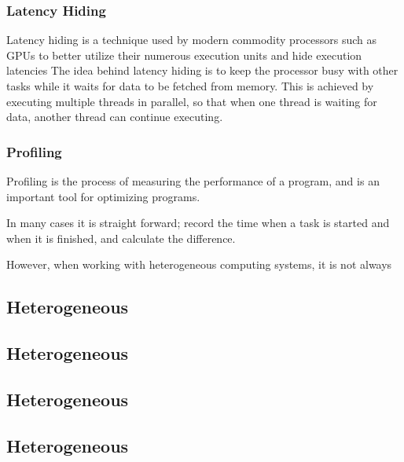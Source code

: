 \subsubsection{Latency Hiding}
Latency hiding is a technique used by modern commodity processors such as GPUs to better utilize their numerous execution units and hide execution latencies \cite[35]{Volkov:EECS-2016-143}
The idea behind latency hiding is to keep the processor busy with other tasks while it waits for data to be fetched from memory.
This is achieved by executing multiple threads in parallel, so that when one thread is waiting for data, another thread can continue executing.


\subsubsection{Profiling}
Profiling is the process of measuring the performance of a program, and is an important tool for optimizing programs.

In many cases it is straight forward; record the time when a task is started and when it is finished, and calculate the difference.


However, when working with heterogeneous computing systems, it is not always


\subsection{Heterogeneous}
\subsection{Heterogeneous}
\subsection{Heterogeneous}
\subsection{Heterogeneous}